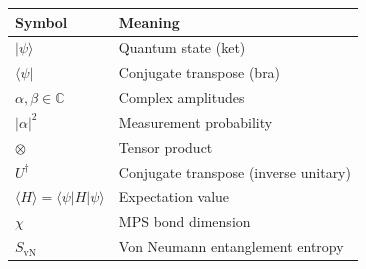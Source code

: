 \documentclass[
  11pt,
  letterpaper,
  oneside]{scrbook}
\begin{document}

\begin{longtable}[]{@{}
  >{\raggedright\arraybackslash}p{}
  >{\raggedright\arraybackslash}p{}@{}}
\toprule\noalign{}
\begin{minipage}[b]{\linewidth}\raggedright
Symbol
\end{minipage} & \begin{minipage}[b]{\linewidth}\raggedright
Meaning
\end{minipage} \\
\midrule\noalign{}
\endhead
\bottomrule\noalign{}
\endlastfoot
\(\vert\psi\rangle\) & Quantum state (ket) \\
\(\langle\psi\vert\) & Conjugate transpose (bra) \\
\(\alpha, \beta \in \mathbb{C}\) & Complex amplitudes \\
\(\vert\alpha\vert^2\) & Measurement probability \\
\(\otimes\) & Tensor product \\
\(U^\dagger\) & Conjugate transpose (inverse unitary) \\
\(\langle H\rangle = \langle\psi\vert H\vert\psi\rangle\) & Expectation
value \\
\(\chi\) & MPS bond dimension \\
\(S_\text{vN}\) & Von Neumann entanglement entropy \\
\end{longtable}


\backmatter
\end{document}
